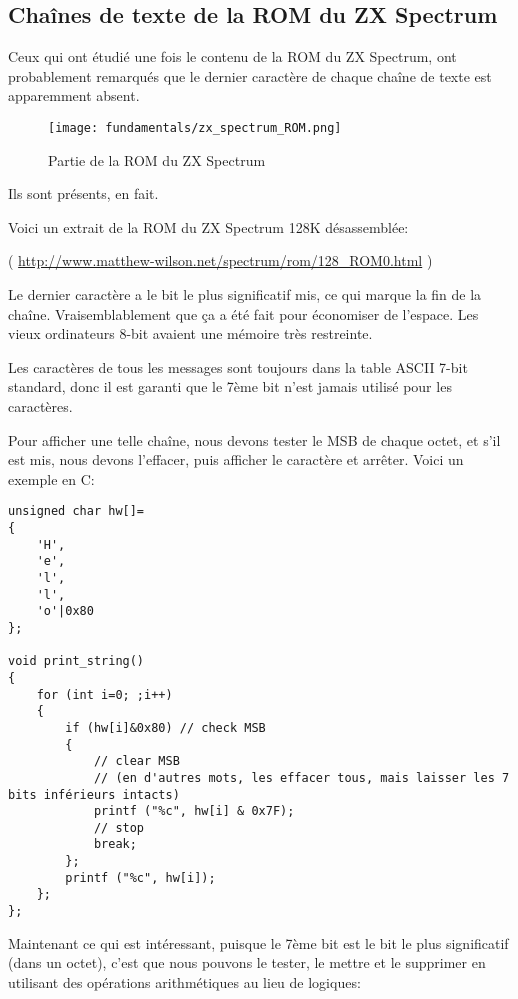 \label{AND_OR_as_SUB_ADD}

\subsection{Chaînes de texte de la ROM du ZX Spectrum}

Ceux qui ont étudié une fois le contenu de la \ac{ROM} du ZX Spectrum, ont probablement
remarqués que le dernier caractère de chaque chaîne de texte est apparemment absent.

\begin{figure}[H]
\centering
\texttt{[image: fundamentals/zx\_spectrum\_ROM.png]}
\caption{Partie de la ROM du ZX Spectrum}
\end{figure}

Ils sont présents, en fait.

Voici un extrait de la ROM du ZX Spectrum 128K désassemblée:


( \url{http://www.matthew-wilson.net/spectrum/rom/128_ROM0.html} )

Le dernier caractère a le bit le plus significatif mis, ce qui marque la fin de la
chaîne.
Vraisemblablement que ça a été fait pour économiser de l'espace.
Les vieux ordinateurs 8-bit avaient une mémoire très restreinte.

Les caractères de tous les messages sont toujours dans la table \ac{ASCII} 7-bit
standard, donc il est garanti que le 7ème bit n'est jamais utilisé pour les caractères.

Pour afficher une telle chaîne, nous devons tester le \ac{MSB} de chaque octet, et
s'il est mis, nous devons l'effacer, puis afficher le caractère et arrêter.
Voici un exemple en C:

\begin{lstlisting}[style=customc]
unsigned char hw[]=
{
	'H',
	'e',
	'l',
	'l',
	'o'|0x80
};

void print_string()
{
	for (int i=0; ;i++)
	{
		if (hw[i]&0x80) // check MSB
		{
			// clear MSB
			// (en d'autres mots, les effacer tous, mais laisser les 7 bits inférieurs intacts)
			printf ("%c", hw[i] & 0x7F);
			// stop
			break;
		};
		printf ("%c", hw[i]);
	};
};
\end{lstlisting}

Maintenant ce qui est intéressant, puisque le 7ème bit est le bit le plus significatif
(dans un octet), c'est que nous pouvons le tester, le mettre et le supprimer en utilisant
des opérations arithmétiques au lieu de logiques:

